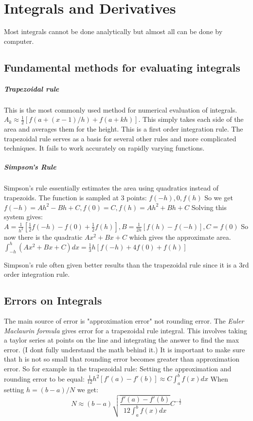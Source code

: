 \documentclass{report}
\begin{document}
\chapter {Integrals and Derivatives}
Most integrals cannot be done analytically but almost all can be done by computer.
\section{Fundamental methods for evaluating integrals}
\paragraph{Trapezoidal rule} This is the most commonly used method for numerical evaluation of integrals. 
$A_k\approx\frac12[f(a+(x-1)/h)+f(a+kh)]$. This simply takes each side of the area and averages them for the height. This is a first order integration rule.
\newline\newline
The trapezoidal rule serves as a basis for several other rules and more complicated techniques. It fails to work accurately on rapidly varying functions.
\paragraph {Simpson's Rule} Simpson's rule essentially estimates the area using quadratics instead of trapezoids. The function is sampled at 3 points: $f(-h), 0, f(h)$ 
\newline
So we get\newline
 $f(-h)=Ah^2-Bh+C, f(0)=C,  f(h)=Ah^2+Bh+C$
\newline\newline
Solving this system gives: $A=\frac1{h^2}[\frac12f(-h)-f(0)+\frac12f(h)], B=\frac1{2h}[f(h)-f(-h)], C=f(0)$
\newline\newline
So now there is the quadratic $Ax^2+Bx+C$ which gives the approximate area. 
$\int_{-h}^{h}(Ax^2+Bx+C)dx=\frac13h[f(-h)+4f(0)+f(h)]$


Simpson's rule often given better results than the trapezoidal rule since it is a 3rd order integration rule.
	
\section{Errors on Integrals}
The main source of error is "approximation error" not rounding error. The \textit{Euler Maclaurin formula} gives error for a trapezoidal rule integral. This involves taking a taylor series at points on the line and integrating the answer to find the max error. (I dont fully understand the math behind it.)
\newline\newline
It is important to make sure that h is not so small that rounding error becomes greater than approximation error.
So for example in the trapezoidal rule: Setting the approximation and rounding error to be equal: $\frac1{12}h^2[f'(a)-f'(b)]\approx C\int_{a}^{b}f(x)dx$
When setting $h=(b-a)/N$ we get:
\[N\approx (b-a)\sqrt{\frac{f'(a)-f'(b)}{12\int_{a}^{b}f(x)dx}}C^{-\frac12}\]
\end{document}
